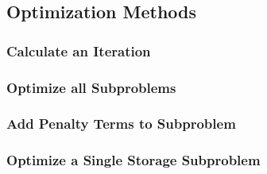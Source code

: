 \subsection{Optimization Methods}

\subsubsection{Calculate an Iteration}
\label{sec:appendix:jl:optimization:calculate-iteration}



\newpage

\subsubsection{Optimize all Subproblems}
\label{sec:appendix:jl:optimization:optimize-all-subproblems}



\subsubsection{Add Penalty Terms to Subproblem}
\label{sec:appendix:jl:optimization:add-penalty-terms}




\subsubsection{Optimize a Single Storage Subproblem}
\label{sec:appendix:jl:optimization:sub-storage}




